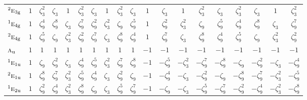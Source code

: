 \documentclass[10pt,a4paper]{article}
\numberwithin{equation}{section}
\newcommand{\irr}[1]{\text{\normalfont\scshape #1}}
\newcommand{\conjpair}[1]{{}^{#1}}
\newcommand{\ptag}[1]{\mathrm{#1}}
\newcommand{\rootunity}[1]{\zeta_{#1}}
\begin{document}
{\begin{longtable}{@{}lcccccccccccccccccc@{}}
$\conjpair{2}\irr{e}_{3\ptag{g}}$ & $1$ & $\rootunity{3}^{2}$ & $\rootunity{3}$ & $1$ & $\rootunity{3}^{2}$ & $\rootunity{3}$ & $1$ & $\rootunity{3}^{2}$ & $\rootunity{3}$ & $1$ & $\rootunity{3}$ & $1$ & $\rootunity{3}^{2}$ & $\rootunity{3}$ & $\rootunity{3}^{2}$ & $\rootunity{3}$ & $1$ & $\rootunity{3}^{2}$\\
$\conjpair{1}\irr{e}_{4\ptag{g}}$ & $1$ & $\rootunity{9}^{4}$ & $\rootunity{9}^{8}$ & $\rootunity{3}$ & $\rootunity{9}^{7}$ & $\rootunity{9}^{2}$ & $\rootunity{3}^{2}$ & $\rootunity{9}$ & $\rootunity{9}^{5}$ & $1$ & $\rootunity{9}^{2}$ & $\rootunity{3}^{2}$ & $\rootunity{9}$ & $\rootunity{9}^{5}$ & $\rootunity{9}^{4}$ & $\rootunity{9}^{8}$ & $\rootunity{3}$ & $\rootunity{9}^{7}$\\
$\conjpair{2}\irr{e}_{4\ptag{g}}$ & $1$ & $\rootunity{9}^{5}$ & $\rootunity{9}$ & $\rootunity{3}^{2}$ & $\rootunity{9}^{2}$ & $\rootunity{9}^{7}$ & $\rootunity{3}$ & $\rootunity{9}^{8}$ & $\rootunity{9}^{4}$ & $1$ & $\rootunity{9}^{7}$ & $\rootunity{3}$ & $\rootunity{9}^{8}$ & $\rootunity{9}^{4}$ & $\rootunity{9}^{5}$ & $\rootunity{9}$ & $\rootunity{3}^{2}$ & $\rootunity{9}^{2}$\\
$\irr{a}_{\ptag{u}}$ & $1$ & $1$ & $1$ & $1$ & $1$ & $1$ & $1$ & $1$ & $1$ & $-1$ & $-1$ & $-1$ & $-1$ & $-1$ & $-1$ & $-1$ & $-1$ & $-1$\\
$\conjpair{1}\irr{e}_{1\ptag{u}}$ & $1$ & $\rootunity{9}$ & $\rootunity{9}^{2}$ & $\rootunity{3}$ & $\rootunity{9}^{4}$ & $\rootunity{9}^{5}$ & $\rootunity{3}^{2}$ & $\rootunity{9}^{7}$ & $\rootunity{9}^{8}$ & $-1$ & $-\rootunity{9}^{5}$ & $-\rootunity{3}^{2}$ & $-\rootunity{9}^{7}$ & $-\rootunity{9}^{8}$ & $-\rootunity{9}$ & $-\rootunity{9}^{2}$ & $-\rootunity{3}$ & $-\rootunity{9}^{4}$\\
$\conjpair{2}\irr{e}_{1\ptag{u}}$ & $1$ & $\rootunity{9}^{8}$ & $\rootunity{9}^{7}$ & $\rootunity{3}^{2}$ & $\rootunity{9}^{5}$ & $\rootunity{9}^{4}$ & $\rootunity{3}$ & $\rootunity{9}^{2}$ & $\rootunity{9}$ & $-1$ & $-\rootunity{9}^{4}$ & $-\rootunity{3}$ & $-\rootunity{9}^{2}$ & $-\rootunity{9}$ & $-\rootunity{9}^{8}$ & $-\rootunity{9}^{7}$ & $-\rootunity{3}^{2}$ & $-\rootunity{9}^{5}$\\
$\conjpair{1}\irr{e}_{2\ptag{u}}$ & $1$ & $\rootunity{9}^{2}$ & $\rootunity{9}^{4}$ & $\rootunity{3}^{2}$ & $\rootunity{9}^{8}$ & $\rootunity{9}$ & $\rootunity{3}$ & $\rootunity{9}^{5}$ & $\rootunity{9}^{7}$ & $-1$ & $-\rootunity{9}$ & $-\rootunity{3}$ & $-\rootunity{9}^{5}$ & $-\rootunity{9}^{7}$ & $-\rootunity{9}^{2}$ & $-\rootunity{9}^{4}$ & $-\rootunity{3}^{2}$ & $-\rootunity{9}^{8}$\\

\end{longtable}}
\end{document}
